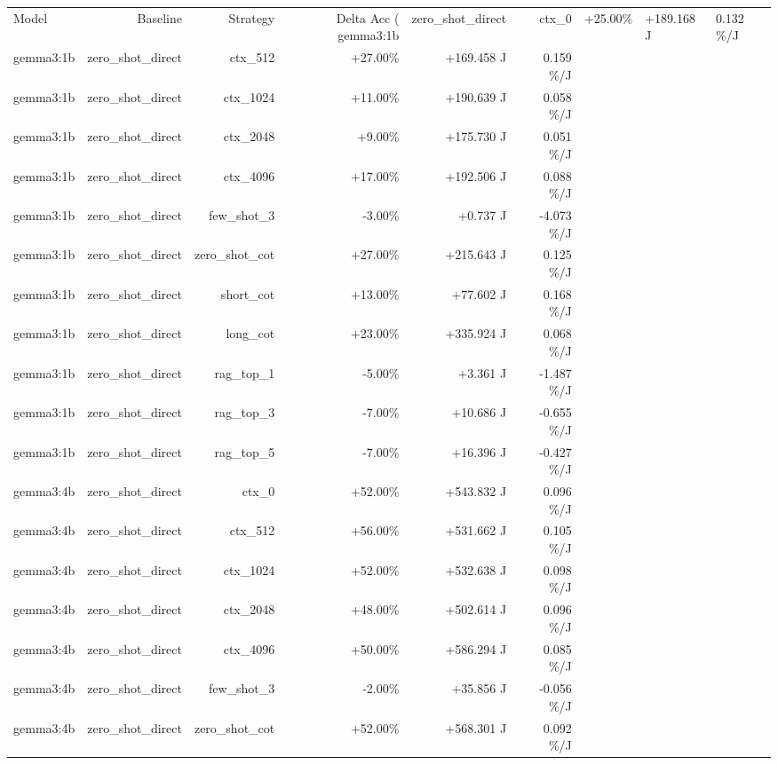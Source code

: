 \begin{table}[t]
\centering
\small
\begin{tabular}{lrrrrr}
\toprule
Model & Baseline & Strategy & Delta Acc (%
\midrule
gemma3:1b & zero\_shot\_direct & ctx\_0 & +25.00\% & +189.168 J & 0.132 \%/J \\
gemma3:1b & zero\_shot\_direct & ctx\_512 & +27.00\% & +169.458 J & 0.159 \%/J \\
gemma3:1b & zero\_shot\_direct & ctx\_1024 & +11.00\% & +190.639 J & 0.058 \%/J \\
gemma3:1b & zero\_shot\_direct & ctx\_2048 & +9.00\% & +175.730 J & 0.051 \%/J \\
gemma3:1b & zero\_shot\_direct & ctx\_4096 & +17.00\% & +192.506 J & 0.088 \%/J \\
gemma3:1b & zero\_shot\_direct & few\_shot\_3 & -3.00\% & +0.737 J & -4.073 \%/J \\
gemma3:1b & zero\_shot\_direct & zero\_shot\_cot & +27.00\% & +215.643 J & 0.125 \%/J \\
gemma3:1b & zero\_shot\_direct & short\_cot & +13.00\% & +77.602 J & 0.168 \%/J \\
gemma3:1b & zero\_shot\_direct & long\_cot & +23.00\% & +335.924 J & 0.068 \%/J \\
gemma3:1b & zero\_shot\_direct & rag\_top\_1 & -5.00\% & +3.361 J & -1.487 \%/J \\
gemma3:1b & zero\_shot\_direct & rag\_top\_3 & -7.00\% & +10.686 J & -0.655 \%/J \\
gemma3:1b & zero\_shot\_direct & rag\_top\_5 & -7.00\% & +16.396 J & -0.427 \%/J \\
gemma3:4b & zero\_shot\_direct & ctx\_0 & +52.00\% & +543.832 J & 0.096 \%/J \\
gemma3:4b & zero\_shot\_direct & ctx\_512 & +56.00\% & +531.662 J & 0.105 \%/J \\
gemma3:4b & zero\_shot\_direct & ctx\_1024 & +52.00\% & +532.638 J & 0.098 \%/J \\
gemma3:4b & zero\_shot\_direct & ctx\_2048 & +48.00\% & +502.614 J & 0.096 \%/J \\
gemma3:4b & zero\_shot\_direct & ctx\_4096 & +50.00\% & +586.294 J & 0.085 \%/J \\
gemma3:4b & zero\_shot\_direct & few\_shot\_3 & -2.00\% & +35.856 J & -0.056 \%/J \\
gemma3:4b & zero\_shot\_direct & zero\_shot\_cot & +52.00\% & +568.301 J & 0.092 \%/J \\

\end{tabular}
\end{table}
